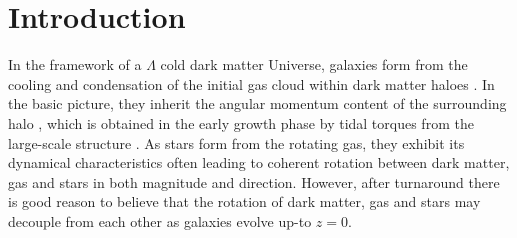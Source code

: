 \documentclass[fleqn,usenatbib]{mnras}
\begin{document}
\section{Introduction}
In the framework of a $\Lambda$ cold dark matter Universe, galaxies form from the cooling and condensation of the initial gas cloud within dark matter haloes \citep{white1978, mo1998}. In the basic picture, they inherit the angular momentum content of the surrounding halo \citep[][]{fall1980}, which is obtained in the early growth phase by tidal torques from the large-scale structure \citep[e.g.][]{peebles1969, Doroshkevich1970}. As stars form from the rotating gas, they exhibit its dynamical characteristics often leading to coherent rotation between dark matter, gas and stars in both magnitude and direction. However, after turnaround there is good reason to believe that the rotation of dark matter, gas and stars may decouple from each other as galaxies evolve up-to $z=0$. 
 
\end{document}

